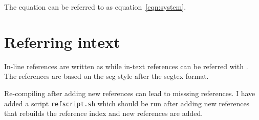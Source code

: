 \documentclass{edger}
\begin{document}
The equation can be referred to as equation~\ref{eqn:system}.

\lipsum[1-7]  

\section*{Referring intext}
In-line references are written as \cite{knuth1989} while in-text references can be referred with \cite[]{knuth1989}. The references are based on the seg style after the segtex format.

Re-compiling after adding new references can lead to misssing references. I have added a script \verb|refscript.sh| which should be run after adding new references that rebuilds the reference index and new references are added. 


\end{document}
